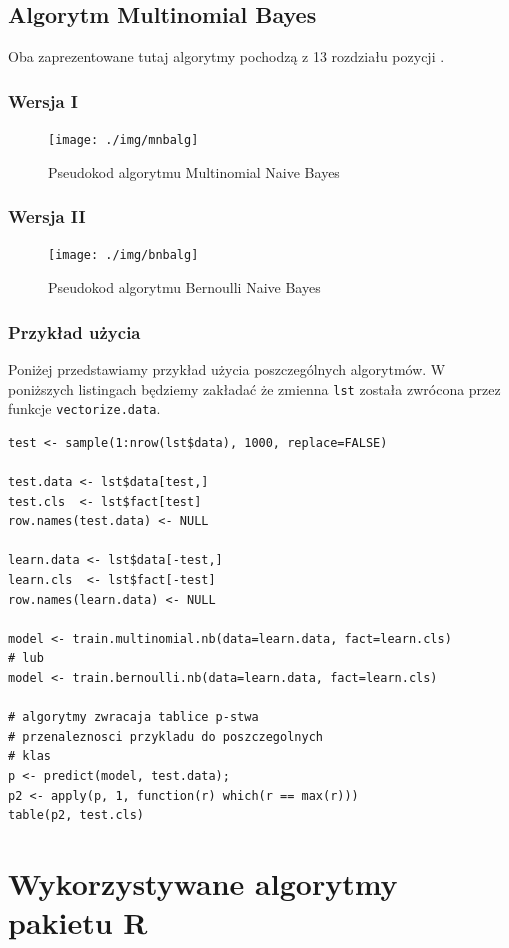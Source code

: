 \documentclass[a4paper,12pt]{article}
\begin{document}
	\subsection{Algorytm Multinomial Bayes}	
		Oba zaprezentowane tutaj algorytmy pochodzą z
		13 rozdziału pozycji \cite{irbook}.
	
		\subsubsection{Wersja I}
		\begin{figure}[!h]
			\centering
			\texttt{[image: ./img/mnbalg]}
			\caption{Pseudokod algorytmu Multinomial Naive Bayes}
		\end{figure}
		
		\subsubsection{Wersja II}
		\begin{figure}[!h]
			\centering
			\texttt{[image: ./img/bnbalg]}
			\caption{Pseudokod algorytmu Bernoulli Naive Bayes}
		\end{figure}
		\clearpage		

		\subsubsection{Przykład użycia}
		Poniżej przedstawiamy przykład użycia poszczególnych algorytmów.
		W poniższych listingach będziemy zakładać że zmienna \texttt{lst}
		została zwrócona przez funkcje \texttt{vectorize.data}.
		\begin{verbatim}
test <- sample(1:nrow(lst$data), 1000, replace=FALSE)

test.data <- lst$data[test,]
test.cls  <- lst$fact[test]
row.names(test.data) <- NULL

learn.data <- lst$data[-test,]
learn.cls  <- lst$fact[-test]
row.names(learn.data) <- NULL

model <- train.multinomial.nb(data=learn.data, fact=learn.cls)
# lub
model <- train.bernoulli.nb(data=learn.data, fact=learn.cls)

# algorytmy zwracaja tablice p-stwa
# przenaleznosci przykladu do poszczegolnych
# klas
p <- predict(model, test.data);
p2 <- apply(p, 1, function(r) which(r == max(r)))
table(p2, test.cls)
		\end{verbatim}
		
		
	
\section{Wykorzystywane algorytmy pakietu R}
\end{document}
